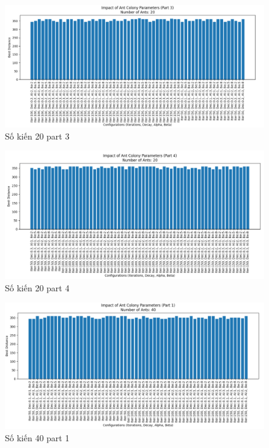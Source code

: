 \documentclass[14pt]{article}
\begin{document}
\begin{center}
		\begin{figure}[htbp]
			\centering
			\includegraphics[width=\textwidth]{./Image/20_part3.png}
			\caption{Số kiến 20 part 3}
			\label{fig:mylabel}
		\end{figure}
		\begin{figure}[htbp]
			\centering
			\includegraphics[width=\textwidth]{./Image/20_part4.png}
			\caption{Số kiến 20 part 4}
			\label{fig:mylabel}
		\end{figure}
		\begin{figure}[htbp]
			\centering
			\includegraphics[width=\textwidth]{./Image/40_part1.png}
			\caption{Số kiến 40 part 1}
			\label{fig:mylabel}
		\end{figure}
		

\end{center}
\end{document}
